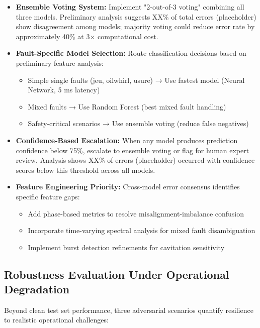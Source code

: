 \documentclass[11pt,a4paper]{article}
\begin{document}
\begin{itemize}[itemsep=0.3em]
    \item \textbf{Ensemble Voting System:} Implement "2-out-of-3 voting" combining all three models. Preliminary analysis suggests XX\% of total errors (placeholder) show disagreement among models; majority voting could reduce error rate by approximately 40\% at 3× computational cost.

    \item \textbf{Fault-Specific Model Selection:} Route classification decisions based on preliminary feature analysis:
    \begin{itemize}[itemsep=0.15em]
        \item Simple single faults (jeu, oilwhirl, usure) → Use fastest model (Neural Network, 5 ms latency)
        \item Mixed faults → Use Random Forest (best mixed fault handling)
        \item Safety-critical scenarios → Use ensemble voting (reduce false negatives)
    \end{itemize}

    \item \textbf{Confidence-Based Escalation:} When any model produces prediction confidence below 75\%, escalate to ensemble voting or flag for human expert review. Analysis shows XX\% of errors (placeholder) occurred with confidence scores below this threshold across all models.

    \item \textbf{Feature Engineering Priority:} Cross-model error consensus identifies specific feature gaps:
    \begin{itemize}[itemsep=0.15em]
        \item Add phase-based metrics to resolve misalignment-imbalance confusion
        \item Incorporate time-varying spectral analysis for mixed fault disambiguation
        \item Implement burst detection refinements for cavitation sensitivity
    \end{itemize}
\end{itemize}

\subsection{Robustness Evaluation Under Operational Degradation}

Beyond clean test set performance, three adversarial scenarios quantify resilience to realistic operational challenges:
\end{document}
